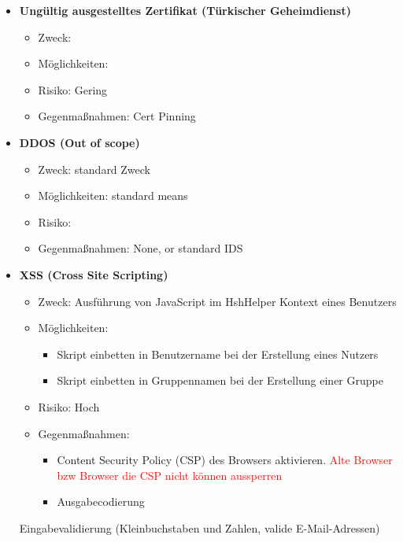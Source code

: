 \documentclass[12pt,DIV14,BCOR10mm,a4paper,parskip=half-,headsepline,headinclude,english,ngerman,bibliography=totocnumbered]{scrreprt}
\begin{document}
\begin{itemize}
  \item \textbf{Ungültig ausgestelltes Zertifikat (Türkischer Geheimdienst)}
  \begin{itemize}
  \item Zweck:
  \item Möglichkeiten:
  \item Risiko: Gering
  \item Gegenmaßnahmen: Cert Pinning
  \end{itemize}

  \item \textbf{DDOS (Out of scope)}
  \begin{itemize}
  \item Zweck: standard Zweck
  \item Möglichkeiten: standard means
  \item Risiko:
  \item Gegenmaßnahmen: None, or standard IDS
  \end{itemize}

  \item \textbf{XSS (Cross Site Scripting)}
  \begin{itemize}
  \item Zweck: Ausführung von JavaScript im HshHelper Kontext eines Benutzers
  \item Möglichkeiten:
  	\begin{itemize}
          \item Skript einbetten in Benutzername bei der Erstellung eines Nutzers
          \item Skript einbetten in Gruppennamen bei der Erstellung einer Gruppe
      \end{itemize}
  \item Risiko: Hoch
  \item Gegenmaßnahmen:
	\begin{itemize}
		\item Content Security Policy (CSP) des Browsers aktivieren. \textcolor{red}{Alte Browser bzw Browser die CSP nicht können aussperren} %

		\item Ausgabecodierung
	\end{itemize}
  \end{itemize}
      Eingabevalidierung (Kleinbuchstaben und Zahlen, valide E-Mail-Adressen)


\end{itemize}
\end{document}
